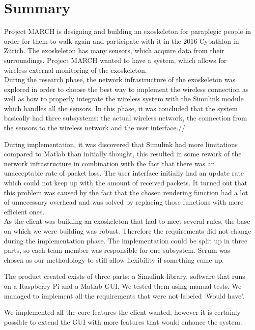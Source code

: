 \chapter*{Summary}
Project MARCH is designing and building an exoskeleton for paraplegic people in order for them to walk again and participate with it in the 2016 Cybathlon in Zürich.  
The exoskeleton has many sensors, which acquire data from their surroundings. Project MARCH wanted to have a system, which allows for wireless external monitoring of the exoskeleton. \\
During the research phase, the network infrastructure of the exoskeleton was explored in order to choose the best way to implement the wireless connection as well as how to properly integrate the wireless system with the Simulink module which handles all the sensors. In this phase, it was concluded that the system basically had three subsystems: the actual wireless network, the connection from the sensors to the wireless network and the user interface.//

During implementation, it was discovered that Simulink had more limitations compared to Matlab than initially thought, this resulted in some rework of the network infrastructure in combination with the fact that there was an unacceptable rate of packet loss. The user interface initially had an update rate which could not keep up with the amount of received packets. It turned out that this problem was caused by the fact that the chosen rendering function had a lot of unnecessary overhead and was solved by replacing those functions with more efficient ones.\\

As the client was building an exoskeleton that had to meet several rules, the base on which we were building was robust. Therefore the requirements did not change during the implementation phase. The implementation could be split up in three parts, so each team member was responsible for one subsystem. Scrum was chosen as our methodology to still allow flexibility if something came up.

The product created exists of three parts: a Simulink library, software that runs on a Raspberry Pi and a Matlab GUI. We tested them using manual tests. We managed to implement all the requirements that were not labeled 'Would have'. 

We implemented all the core features the client wanted, however it is certainly possible to extend the GUI with more features that would enhance the system.	




